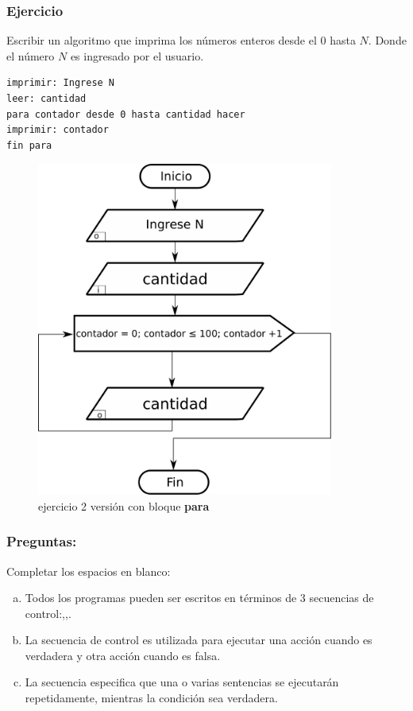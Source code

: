 \subsubsection{Ejercicio}
Escribir un algoritmo que imprima los números enteros desde el 0 hasta $N$. Donde el número $N$ es ingresado por el usuario.

\begin{lstlisting}[style=pseudocodigo]
imprimir: Ingrese N
leer: cantidad
para contador desde 0 hasta cantidad hacer
imprimir: contador
fin para
\end{lstlisting}

\begin{figure}[h!]
  \centering
  \includegraphics[height=110mm]{./img/ejercicio_3.pdf} 
  \caption{ejercicio 2 versión con bloque \textbf{para}}
\end{figure}

\pagebreak
\subsubsection{Preguntas:}
Completar los espacios en blanco:\\
\begin{enumerate}[a)]
  \item Todos los programas pueden ser escritos en términos de 3 secuencias de control:\underspace,\underspace,\underspace.
  \item La secuencia de control \underspace es utilizada para ejecutar una acción cuando es verdadera y otra acción cuando es falsa.
  \item La secuencia \underspace especifica que una o varias sentencias se ejecutarán repetidamente, mientras la condición sea verdadera.
\end{enumerate}



